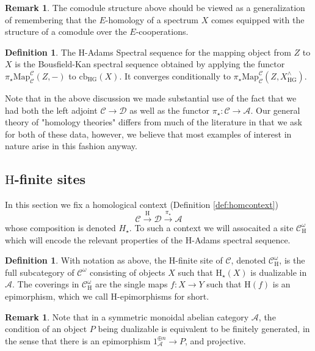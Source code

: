\documentclass[10pt]{amsart}
\theoremstyle{definition}
\numberwithin{figure}{section}
\numberwithin{equation}{section}
\newtheorem{definition}[figure]{Definition}
\newtheorem{remark}[figure]{Remark}
\newcommand{\cA}{\mathcal{A}}
\newcommand{\cC}{\mathcal{C}}
\newcommand{\cD}{\mathcal{D}}
\newcommand{\one}{\mathrm{1}}
\theoremstyle{cited}
\newcommand{\Map}{\mathrm{Map}}
\newcommand{\cb}{\mathrm{cb}}
\renewcommand{\H}{\mathrm{H}}
\newcommand{\G}{\mathrm{G}}
\begin{document}
\begin{remark}
  The comodule structure above should be viewed as a generalization of remembering that the $E$-homology of a spectrum $X$ comes equipped with the structure of a comodule over the $E$-cooperations.
\end{remark}

\begin{definition}
  The $\H$-Adams Spectral sequence for the mapping object from $Z$ to $X$ is the Bousfield-Kan spectral sequence obtained by applying the functor $\pi_\star\Map_{\cC}^{\cC}(Z, -)$ to $\cb_{\H\G}(X)$. It converges conditionally to $\pi_\star\Map_{\cC}^{\cC}(Z,X^\wedge_{\H\G})$.
\end{definition}

Note that in the above discussion we made substantial use of the fact that we had both the left adjoint $\cC\to \cD$ as well as the functor $\pi_\star:\cC\to \cA$. Our general theory of "homology theories" differs from much of the literature in that we ask for both of these data, however, we believe that most examples of interest in nature arise in this fashion anyway.

\subsection{$\H$-finite sites}

In this section we fix a homological context (Definition \ref{def:homcontext})
\[
\cC\xrightarrow{\H} \cD \xrightarrow{\pi_\star} \cA
\]
whose composition is denoted $H_\star$. To such a context we will assocaited a site $\cC_{\H}^\omega$ which will encode the relevant properties of the $\H$-Adams spectral sequence.

\begin{definition}
  With notation as above, the $\H$-finite site of $\cC$, denoted $\cC^{\omega}_{\H}$, is the full subcategory of $\cC^\omega$ consisting of objects $X$ such that $\H_{\star}(X)$ is dualizable in $\cA$. The coverings in $\cC^\omega_{\H}$ are the single maps $f:X\to Y$ such that $\H(f)$ is an epimorphism, which we call $\H$-epimorphisms for short.
\end{definition}

\begin{remark}
  Note that in a symmetric monoidal abelian category $\cA$, the condition of an object $P$ being dualizable is equivalent to be finitely generated, in the sense that there is an epimorphism $\one_{\cA}^{\oplus n}\to P$, and projective.
\end{remark}
\end{document}
